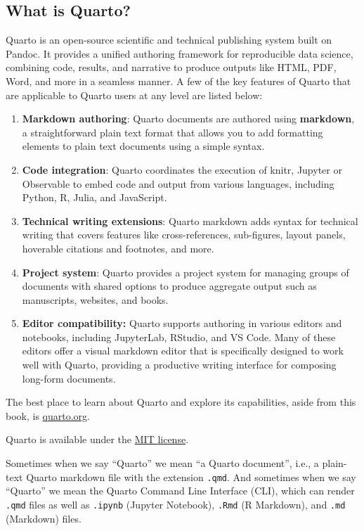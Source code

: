 \documentclass[
  letterpaper,
  DIV=11,
  numbers=noendperiod,
  oneside]{scrreprt}
\begin{document}
\begin{tcolorbox}
\section{What is Quarto?}\label{what-is-quarto}

Quarto is an open-source scientific and technical publishing system
built on Pandoc\footnotemark{}. It provides a unified authoring
framework for reproducible data science, combining code, results, and
narrative to produce outputs like HTML, PDF, Word, and more in a
seamless manner. A few of the key features of Quarto that are applicable
to Quarto users at any level are listed below:

\begin{enumerate}
\def\labelenumi{\arabic{enumi}.}
\item
  \textbf{Markdown authoring}: Quarto documents are authored using
  \textbf{markdown}, a straightforward plain text format that allows you
  to add formatting elements to plain text documents using a simple
  syntax.
\item
  \textbf{Code integration}: Quarto coordinates the execution of knitr,
  Jupyter or Observable to embed code and output from various languages,
  including Python, R, Julia, and JavaScript.
\item
  \textbf{Technical writing extensions}: Quarto markdown adds syntax for
  technical writing that covers features like cross-references,
  sub-figures, layout panels, hoverable citations and footnotes, and
  more.
\item
  \textbf{Project system}: Quarto provides a project system for managing
  groups of documents with shared options to produce aggregate output
  such as manuscripts, websites, and books.
\item
  \textbf{Editor compatibility:} Quarto supports authoring in various
  editors and notebooks, including JupyterLab, RStudio, and VS Code.
  Many of these editors offer a visual markdown editor that is
  specifically designed to work well with Quarto, providing a productive
  writing interface for composing long-form documents.
\end{enumerate}

The best place to learn about Quarto and explore its capabilities, aside
from this book, is \href{https://quarto.org/}{quarto.org}.

Quarto is available under the \href{https://quarto.org/license.html}{MIT
license}.

Sometimes when we say ``Quarto'' we mean ``a Quarto document'', i.e., a
plain-text Quarto markdown file with the extension \texttt{.qmd}. And
sometimes when we say ``Quarto'' we mean the Quarto Command Line
Interface (CLI), which can render \texttt{.qmd} files as well as
\texttt{.ipynb} (Jupyter Notebook), \texttt{.Rmd} (R Markdown), and
\texttt{.md} (Markdown) files.


\end{tcolorbox}
\end{document}

